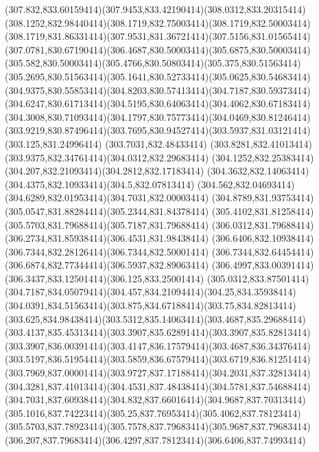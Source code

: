 {{	\curveto(307.832,833.60159414)(307.9453,833.42190414)(308.0312,833.20315414)
	\curveto(308.1252,832.98440414)(308.1719,832.75003414)(308.1719,832.50003414)
	\curveto(308.1719,831.86331414)(307.9531,831.36721414)(307.5156,831.01565414)
	\curveto(307.0781,830.67190414)(306.4687,830.50003414)(305.6875,830.50003414)
	\curveto(305.582,830.50003414)(305.4766,830.50803414)(305.375,830.51563414)
	\curveto(305.2695,830.51563414)(305.1641,830.52733414)(305.0625,830.54683414)
	\curveto(304.9375,830.55853414)(304.8203,830.57413414)(304.7187,830.59373414)
	\curveto(304.6247,830.61713414)(304.5195,830.64063414)(304.4062,830.67183414)
	\curveto(304.3008,830.71093414)(304.1797,830.75773414)(304.0469,830.81246414)
	\curveto(303.9219,830.87496414)(303.7695,830.94527414)(303.5937,831.03121414)
	\lineto(303.125,831.24996414)
	\lineto(303.7031,832.48433414)
	\curveto(303.8281,832.41013414)(303.9375,832.34761414)(304.0312,832.29683414)
	\curveto(304.1252,832.25383414)(304.207,832.21093414)(304.2812,832.17183414)
	\curveto(304.3632,832.14063414)(304.4375,832.10933414)(304.5,832.07813414)
	\curveto(304.562,832.04693414)(304.6289,832.01953414)(304.7031,832.00003414)
	\curveto(304.8789,831.93753414)(305.0547,831.88284414)(305.2344,831.84378414)
	\curveto(305.4102,831.81258414)(305.5703,831.79688414)(305.7187,831.79688414)
	\curveto(306.0312,831.79688414)(306.2734,831.85938414)(306.4531,831.98438414)
	\curveto(306.6406,832.10938414)(306.7344,832.28126414)(306.7344,832.50001414)
	\curveto(306.7344,832.64454414)(306.6874,832.77344414)(306.5937,832.89063414)
	\curveto(306.4997,833.00391414)(306.3437,833.12501414)(306.125,833.25001414)
	\lineto(305.0312,833.87501414)
	\curveto(304.7187,834.05079414)(304.457,834.21094414)(304.25,834.35938414)
	\curveto(304.0391,834.51563414)(303.875,834.67188414)(303.75,834.82813414)
	\curveto(303.625,834.98438414)(303.5312,835.14063414)(303.4687,835.29688414)
	\curveto(303.4137,835.45313414)(303.3907,835.62891414)(303.3907,835.82813414)
	\curveto(303.3907,836.00391414)(303.4147,836.17579414)(303.4687,836.34376414)
	\curveto(303.5197,836.51954414)(303.5859,836.67579414)(303.6719,836.81251414)
	\curveto(303.7969,837.00001414)(303.9727,837.17188414)(304.2031,837.32813414)
	\curveto(304.3281,837.41013414)(304.4531,837.48438414)(304.5781,837.54688414)
	\curveto(304.7031,837.60938414)(304.832,837.66016414)(304.9687,837.70313414)
	\curveto(305.1016,837.74223414)(305.25,837.76953414)(305.4062,837.78123414)
	\curveto(305.5703,837.78923414)(305.7578,837.79683414)(305.9687,837.79683414)
	\curveto(306.207,837.79683414)(306.4297,837.78123414)(306.6406,837.74993414)
}}
